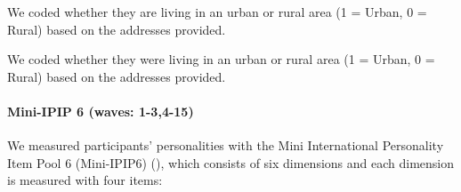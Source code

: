 \documentclass[
  singlecolumn]{article}
\let\oldparagraph\paragraph
\renewcommand{\paragraph}[1]{\oldparagraph{#1}\mbox{}}
\begin{document}
We coded whether they are living in an urban or rural area (1 = Urban, 0
= Rural) based on the addresses provided.

We coded whether they were living in an urban or rural area (1 = Urban,
0 = Rural) based on the addresses provided.

\paragraph{Mini-IPIP 6 (waves:
1-3,4-15)}\label{mini-ipip-6-waves-1-34-15}

We measured participants' personalities with the Mini International
Personality Item Pool 6 (Mini-IPIP6) (), which consists of six dimensions and each
dimension is measured with four items:
\end{document}
